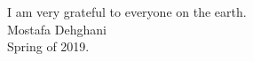 \acknowledgments

I am very grateful to everyone on the earth.\\[2ex]				
\hfill Mostafa Dehghani\\
Spring of 2019.

